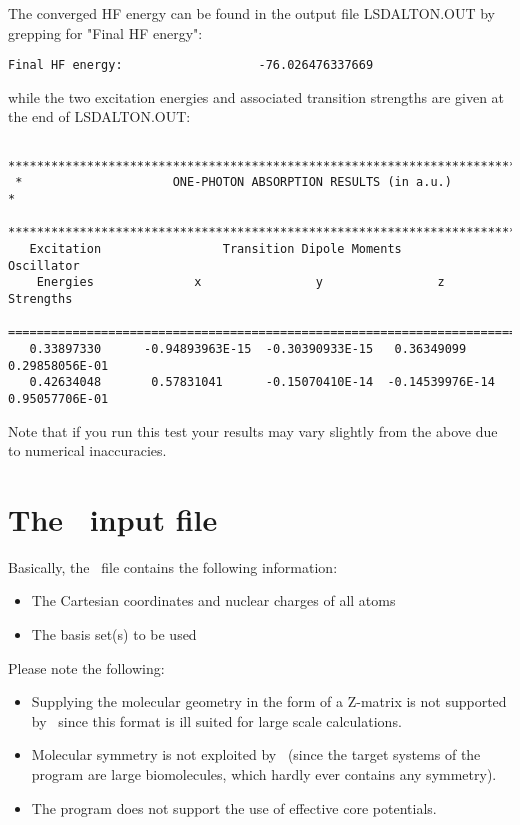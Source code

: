 The converged HF energy can be found in the output file LSDALTON.OUT by grepping for "Final HF energy":
\begin{verbatim}
Final HF energy:                   -76.026476337669
\end{verbatim}
while the two excitation energies and associated transition strengths are given at the end of LSDALTON.OUT:
\begin{verbatim}
 ***********************************************************************************
 *                     ONE-PHOTON ABSORPTION RESULTS (in a.u.)                     *
 ***********************************************************************************
   Excitation                 Transition Dipole Moments                  Oscillator
    Energies              x                y                z            Strengths
 ====================================================================================
   0.33897330      -0.94893963E-15  -0.30390933E-15   0.36349099       0.29858056E-01
   0.42634048       0.57831041      -0.15070410E-14  -0.14539976E-14   0.95057706E-01
\end{verbatim}
Note that if you run this test your results may vary slightly from the above due to 
numerical inaccuracies.


\section{The \mol\ input file}
\label{molfile}

Basically, the \mol\ file contains the following information:
\begin{itemize}
\item The Cartesian coordinates and nuclear charges of all atoms
\item The basis set(s) to be used
\end{itemize}

Please note the following:
\begin{itemize}
\item Supplying the molecular geometry in the form of a Z-matrix 
is not supported
by \lsdalton\, since this format is ill suited for large scale 
calculations.
\item Molecular symmetry is not exploited by \lsdalton\, (since
the target systems of the program are large biomolecules, which
hardly ever contains any symmetry). 
\item The {\lsdalton} program does not support the use of effective core potentials.

\end{itemize}

